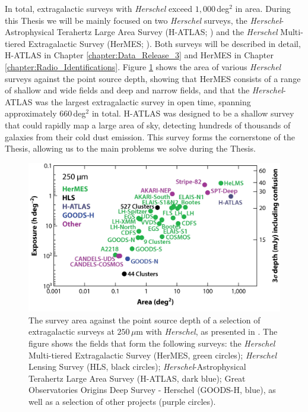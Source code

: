 In total, extragalactic surveys with \textit{Herschel} exceed $1,000\,$deg$^2$ in area. During this Thesis we will be mainly focused on two \textit{Herschel} surveys, the \textit{Herschel}-Astrophysical Terahertz Large Area Survey (H-ATLAS; \citealt{Eales_2010}) and the \textit{Herschel} Multi-tiered Extragalactic Survey (HerMES; \citealt{Oliver_2012}). Both surveys will be described in detail, H-ATLAS in Chapter \ref{chapter:Data_Release_3} and HerMES in Chapter \ref{chapter:Radio_Identifications}. Figure \ref{fig:herschel_surveys} shows the area of various \textit{Herschel} surveys against the point source depth, showing that HerMES consists of a range of shallow and wide fields and deep and narrow fields, and that the \textit{Herschel}-ATLAS was the largest extragalactic survey in open time, spanning approximately $660\,$deg$^2$ in total. H-ATLAS was designed to be a shallow survey that could rapidly map a large area of sky, detecting hundreds of thousands of galaxies from their cold dust emission. This survey forms the cornerstone of the Thesis, allowing us to {\color{red}the main problems we solve during the Thesis}.

\begin{figure}
    \centering
	\includegraphics[width=0.9\columnwidth]{Figures/herschel_surveys.pdf}
	\caption{The survey area against the point source depth of a selection of extragalactic surveys at $250\,\mu$m with \textit{Herschel}, as presented in \citealt{Lutz_2014}. The figure shows the fields that form the following surveys: the \textit{Herschel} Multi-tiered Extragalactic Survey (HerMES, green circles); \textit{Herschel} Lensing Survey (HLS, black circles); \textit{Herschel}-Astrophysical Terahertz Large Area Survey (H-ATLAS, dark blue); Great Observatories Origins Deep Survey - Herschel (GOODS-H, blue), as well as a selection of other projects (purple circles).}
	\label{fig:herschel_surveys}
\end{figure}

